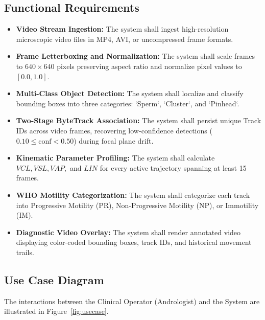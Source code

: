 \documentclass[12pt,a4paper]{report}
\begin{document}
\subsection{Functional Requirements}
\begin{itemize}
    \item \textbf{Video Stream Ingestion:} The system shall ingest high-resolution microscopic video files in MP4, AVI, or uncompressed frame formats.
    \item \textbf{Frame Letterboxing and Normalization:} The system shall scale frames to $640 \times 640$ pixels preserving aspect ratio and normalize pixel values to $[0.0, 1.0]$.
    \item \textbf{Multi-Class Object Detection:} The system shall localize and classify bounding boxes into three categories: `Sperm`, `Cluster`, and `Pinhead`.
    \item \textbf{Two-Stage ByteTrack Association:} The system shall persist unique Track IDs across video frames, recovering low-confidence detections ($0.10 \le \text{conf} < 0.50$) during focal plane drift.
    \item \textbf{Kinematic Parameter Profiling:} The system shall calculate $VCL, VSL, VAP,$ and $LIN$ for every active trajectory spanning at least 15 frames.
    \item \textbf{WHO Motility Categorization:} The system shall categorize each track into Progressive Motility (PR), Non-Progressive Motility (NP), or Immotility (IM).
    \item \textbf{Diagnostic Video Overlay:} The system shall render annotated video displaying color-coded bounding boxes, track IDs, and historical movement trails.
\end{itemize}

\subsection{Use Case Diagram}
The interactions between the Clinical Operator (Andrologist) and the System are illustrated in Figure~\ref{fig:usecase}.
\end{document}

